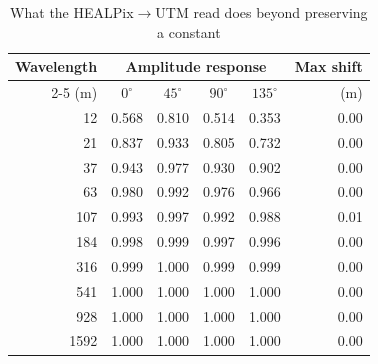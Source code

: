 \begin{table}[t]
\centering
\caption{What the HEALPix$\to$UTM read does beyond preserving a constant}
\label{tab:operator_tests}
\footnotesize
\begin{tabular}{@{}rccccr@{}}
\toprule
Wavelength & \multicolumn{4}{c}{Amplitude response} & Max shift \\
\cmidrule(lr){2-5}
(m) & $0^\circ$ & $45^\circ$ & $90^\circ$ & $135^\circ$ & (m) \\
\midrule
12 & 0.568 & 0.810 & 0.514 & 0.353 & 0.00 \\
21 & 0.837 & 0.933 & 0.805 & 0.732 & 0.00 \\
37 & 0.943 & 0.977 & 0.930 & 0.902 & 0.00 \\
63 & 0.980 & 0.992 & 0.976 & 0.966 & 0.00 \\
107 & 0.993 & 0.997 & 0.992 & 0.988 & 0.01 \\
184 & 0.998 & 0.999 & 0.997 & 0.996 & 0.00 \\
316 & 0.999 & 1.000 & 0.999 & 0.999 & 0.00 \\
541 & 1.000 & 1.000 & 1.000 & 1.000 & 0.00 \\
928 & 1.000 & 1.000 & 1.000 & 1.000 & 0.00 \\
1592 & 1.000 & 1.000 & 1.000 & 1.000 & 0.00 \\
\bottomrule
\end{tabular}

\end{table}
